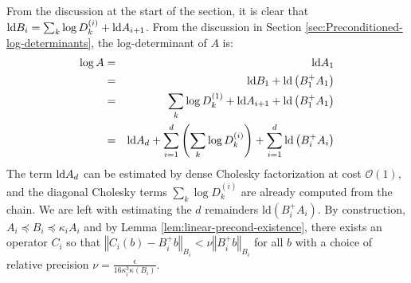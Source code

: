 From the discussion at the start of the section, it is clear that
$\text{\textnormal{ld}} B_{i}=\sum_{k}\log D_{k}^{\left(i\right)}+\text{\textnormal{ld}} A_{i+1}$. From
the discussion in Section \ref{sec:Preconditioned-log-determinants},
the log-determinant of $A$ is: 
\begin{eqnarray*}
\log A & = & \text{\textnormal{ld}} A_{1}\\
 & = & \text{\textnormal{ld}} B_{1}+\text{\textnormal{ld}}\left(B_{1}^{+}A_{1}\right)\\
 & = & \sum_{k}\log D_{k}^{\left(1\right)}+\text{\textnormal{ld}} A_{i+1}+\text{\textnormal{ld}}\left(B_{1}^{+}A_{1}\right)\\
 & = & \text{\textnormal{ld}} A_{d}+\sum_{i=1}^{d}\left(\sum_{k}\log D_{k}^{\left(i\right)}\right)+\sum_{i=1}^{d}\text{\textnormal{ld}}\left(B_{i}^{+}A_{i}\right)
\end{eqnarray*}
The term $\text{\textnormal{ld}} A_{d}$ can be estimated by dense Cholesky factorization
at cost $\mathcal{O}\left(1\right)$, and the diagonal Cholesky terms
$\sum_{k}\log D_{k}^{\left(i\right)}$ are already computed from the
chain. We are left with estimating the $d$ remainders $\text{ld}\left(B_{i}^{+}A_{i}\right)$.
By construction, $A_{i}\preceq B_{i}\preceq\kappa_{i}A_{i}$ and by
Lemma \ref{lem:linear-precond-existence}, there exists an operator
$C_{i}$ so that $\left\Vert C_{i}\left(b\right)-B_{i}^{+}b\right\Vert _{B_{i}}<\nu\left\Vert B_{i}^{+}b\right\Vert _{B_{i}}$
for all $b$ with a choice of relative precision $\nu=\frac{\epsilon}{16\kappa_{i}^{3}\kappa\left(B_{i}\right)}$.

